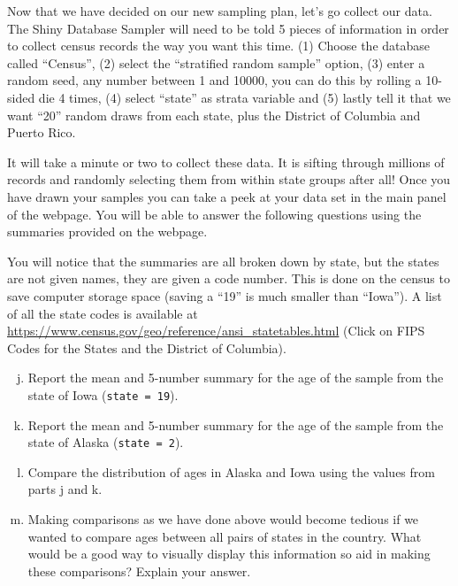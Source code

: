 \documentclass[11pt]{isuthesis}\usepackage[]{graphicx}\usepackage[]{color}
\begin{document}
\begin{appendices}
Now that we have decided on our new sampling plan, let's go collect our data.  The Shiny Database Sampler will need to be told 5 pieces of information in order to collect census records the way you want this time. (1) Choose the database called ``Census'', (2) select the ``stratified random sample'' option, (3) enter a random seed, any number between 1 and 10000, you can do this by rolling a 10-sided die 4 times, (4) select ``state'' as strata variable and (5) lastly tell it that we want ``20'' random draws from each state, plus the District of Columbia and Puerto Rico.  

It will take a minute or two to collect these data. It is sifting through millions of records and randomly selecting them from within state groups after all! Once you have drawn your samples you can take a peek at your data set in the main panel of the webpage. You will be able to answer the following questions using the summaries provided on the webpage.  

You will notice that the summaries are all broken down by state, but the states are not given names, they are given a code number.  This is done on the census to save computer storage space (saving a ``19'' is much smaller than ``Iowa'').  A list of all the state codes is available at \url{https://www.census.gov/geo/reference/ansi\_statetables.html} (Click on FIPS Codes for the States and the District of Columbia).

\begin{enumerate}[(a)]
\setcounter{enumi}{9}
\item Report the mean and 5-number summary for the age of the sample from the state of Iowa (\texttt{state = 19}).
\item	Report the mean and 5-number summary for the age of the sample from the state of Alaska (\texttt{state = 2}).
\item	Compare the distribution of ages in Alaska and Iowa using the values from parts j and k.
\item	Making comparisons as we have done above would become tedious if we wanted to compare ages between all pairs of states in the country.  What would be a good way to visually display this information so aid in making these comparisons? Explain your answer.
\end{enumerate}


% 
% 
% 
% 


\end{appendices}
\end{document}
